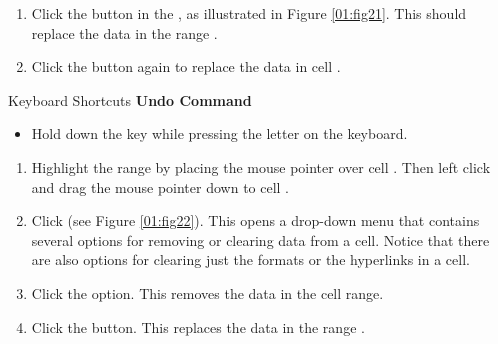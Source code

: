 \begin{enumbox}
	\begin{enumerate}
		\item Click the  button in the , as illustrated in Figure \ref{01:fig21}. This should replace the data in the range .
		\item Click the  button again to replace the data in cell .
	\end{enumerate}
\end{enumbox}

\begin{center}
	\begin{shtcutbox}{Keyboard Shortcuts}
		\textbf{Undo Command}
		\\
		\begin{itemize}
			\setlength{\itemsep}{0pt}
			\setlength{\parskip}{0pt}
			\setlength{\parsep}{0pt}
			
			\item Hold down the  key while pressing the letter  on the keyboard.
			
		\end{itemize}
	\end{shtcutbox}
\end{center}

\begin{enumbox}
	\begin{enumerate}
		\item Highlight the range  by placing the mouse pointer over cell . Then left click and drag the mouse pointer down to cell .
		\item Click  (see Figure \ref{01:fig22}). This opens a drop-down menu that contains several options for removing or clearing data from a cell. Notice that there are also options for clearing just the formats or the hyperlinks in a cell.
		\item Click the  option. This removes the data in the cell range.
		\item Click the  button. This replaces the data in the range .
	\end{enumerate}
\end{enumbox}

